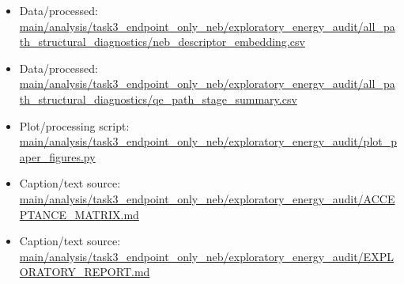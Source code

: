 \begin{itemize}[leftmargin=1.4em,noitemsep]
\item Data/processed: \begingroup\scriptsize\url{main/analysis/task3_endpoint_only_neb/exploratory_energy_audit/all_path_structural_diagnostics/neb_descriptor_embedding.csv}\endgroup
\item Data/processed: \begingroup\scriptsize\url{main/analysis/task3_endpoint_only_neb/exploratory_energy_audit/all_path_structural_diagnostics/qe_path_stage_summary.csv}\endgroup
\item Plot/processing script: \begingroup\scriptsize\url{main/analysis/task3_endpoint_only_neb/exploratory_energy_audit/plot_paper_figures.py}\endgroup
\item Caption/text source: \begingroup\scriptsize\url{main/analysis/task3_endpoint_only_neb/exploratory_energy_audit/ACCEPTANCE_MATRIX.md}\endgroup
\item Caption/text source: \begingroup\scriptsize\url{main/analysis/task3_endpoint_only_neb/exploratory_energy_audit/EXPLORATORY_REPORT.md}\endgroup
\end{itemize}
